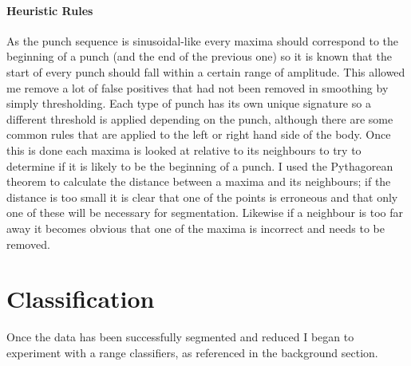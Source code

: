 \begin{figure}[h]
\begin{minipage}{9.0cm}
    \label{fig:kinect3}
\end{minipage}
\end{figure}

\paragraph{Heuristic Rules}
As the punch sequence is sinusoidal-like every maxima should correspond to the beginning of a punch (and the end of the previous one) so it is known that the start of every punch should fall within a certain range of amplitude. This allowed me remove a lot of false positives that had not been removed in smoothing by simply thresholding. Each type of punch has its own unique signature so a different threshold is applied depending on the punch, although there are some common rules that are applied to the left or right hand side of the body. Once this is done each maxima is looked at relative to its neighbours to try to determine if it is likely to be the beginning of a punch. I used the Pythagorean theorem to calculate the distance between a maxima and its neighbours; if the distance is too small it is clear that one of the points is erroneous and that only one of these will be necessary for segmentation. Likewise if a neighbour is too far away it becomes obvious that one of the maxima is incorrect and needs to be removed. 

\section{Classification}
Once the data has been successfully segmented and reduced I began to experiment with a range classifiers, as referenced in the background section. 


